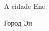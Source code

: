 \newpage
\MyriadPro\itshape
\begin{center}
\small
A cidade Ene

Город Эн
\end{center}

\scriptsize


%









